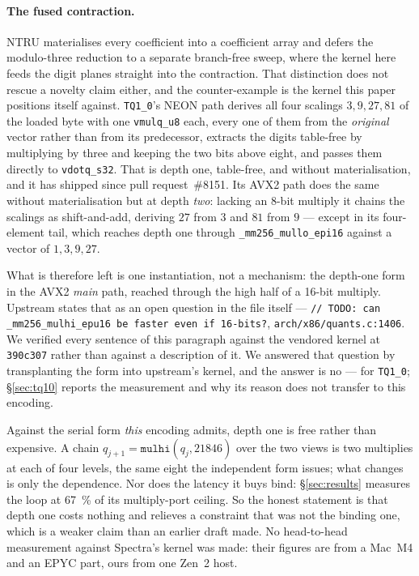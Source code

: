 \documentclass[11pt,a4paper]{article}
\newcommand{\code}[1]{\texttt{#1}}
\begin{document}
\paragraph{The fused contraction.} NTRU materialises every coefficient into a
coefficient array
and defers the modulo-three reduction to a separate branch-free sweep,
where the kernel here feeds the digit planes straight into the
contraction. That distinction does not rescue a novelty claim
either, and the counter-example is the kernel this paper positions itself
against. \code{TQ1\_0}'s NEON path derives all four scalings
$3,9,27,81$ of the loaded byte with one \code{vmulq\_u8} each, every one
of them from the \emph{original} vector rather than from its predecessor,
extracts the digits table-free by multiplying by three and keeping the two
bits above eight, and passes them directly to \code{vdotq\_s32}. That is
depth one, table-free, and without materialisation, and it has shipped
since pull request~\#8151. Its AVX2 path does the same without
materialisation but at depth \emph{two}: lacking an 8-bit multiply it
chains the scalings as shift-and-add, deriving $27$ from $3$ and $81$ from
$9$ --- except in its four-element tail, which reaches depth one through
\code{\_mm256\_mullo\_epi16} against a vector of $1,3,9,27$.

What is therefore left is one instantiation, not a mechanism: the depth-one
form in the AVX2 \emph{main} path, reached through the high half of a
16-bit multiply. Upstream states that as an open question in the file
itself --- \code{// TODO: can \_mm256\_mulhi\_epu16 be faster even if
16-bits?}, \code{arch/x86/quants.c:1406}. We verified every sentence of
this paragraph against the vendored kernel at \code{390c307} rather than
against a description of it. We answered that question by transplanting the
form into upstream's kernel, and the answer is no --- for \code{TQ1\_0};
\S\ref{sec:tq10} reports the measurement and why its reason does not transfer
to this encoding.

Against the serial form \emph{this} encoding admits, depth
one is free rather than expensive. A chain
$q_{j+1}=\code{mulhi}(q_{j},\num{21846})$ over the two views is two
multiplies at each of four levels, the same eight the independent form
issues; what changes is only the dependence. Nor does the latency it buys
bind: \S\ref{sec:results} measures the loop at \SI{67}{\percent} of its
multiply-port ceiling. So the honest statement is that depth one costs
nothing and relieves a constraint that was not the binding one, which is a
weaker claim than an earlier draft made. No head-to-head measurement
against Spectra's kernel was made: their figures are from a Mac~M4 and an
EPYC part, ours from one Zen~2 host.
\end{document}
